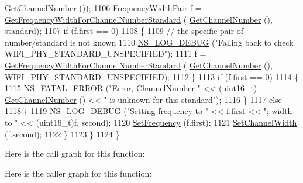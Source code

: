 \begin{DoxyCode}
      \hyperlink{classns3_1_1WifiPhy_a5cf0ccf06109ace61db51c83e91b7e8d}{GetChannelNumber} ());
1106       \hyperlink{classns3_1_1WifiPhy_abb7b47ebed22c2703bcc239729d1e40c}{FrequencyWidthPair} \hyperlink{buildings__pathloss_8m_aa52d3a6e3de5a80a97c12364caeaa125}{f} = 
      \hyperlink{classns3_1_1WifiPhy_ad4ffecf66d648b47d62ad73143a3fcbc}{GetFrequencyWidthForChannelNumberStandard} (
      \hyperlink{classns3_1_1WifiPhy_a5cf0ccf06109ace61db51c83e91b7e8d}{GetChannelNumber} (), standard);
1107       \textcolor{keywordflow}{if} (f.first == 0)
1108         \{
1109           \textcolor{comment}{// the specific pair of number/standard is not known}
1110           \hyperlink{group__logging_ga413f1886406d49f59a6a0a89b77b4d0a}{NS\_LOG\_DEBUG} (\textcolor{stringliteral}{"Falling back to check WIFI\_PHY\_STANDARD\_UNSPECIFIED"});
1111           f = \hyperlink{classns3_1_1WifiPhy_ad4ffecf66d648b47d62ad73143a3fcbc}{GetFrequencyWidthForChannelNumberStandard} (
      \hyperlink{classns3_1_1WifiPhy_a5cf0ccf06109ace61db51c83e91b7e8d}{GetChannelNumber} (), \hyperlink{group__wifi_gga1299834f4e1c615af3ca738033b76a49a95f590f4512ff9645bba0b4f2650f92d}{WIFI\_PHY\_STANDARD\_UNSPECIFIED});
1112         \}
1113       \textcolor{keywordflow}{if} (f.first == 0)
1114         \{
1115           \hyperlink{group__fatal_ga5131d5e3f75d7d4cbfd706ac456fdc85}{NS\_FATAL\_ERROR} (\textcolor{stringliteral}{"Error, ChannelNumber "} << (uint16\_t)
      \hyperlink{classns3_1_1WifiPhy_a5cf0ccf06109ace61db51c83e91b7e8d}{GetChannelNumber} () << \textcolor{stringliteral}{" is unknown for this standard"});
1116         \}
1117       \textcolor{keywordflow}{else}
1118         \{
1119           \hyperlink{group__logging_ga413f1886406d49f59a6a0a89b77b4d0a}{NS\_LOG\_DEBUG} (\textcolor{stringliteral}{"Setting frequency to "} << f.first << \textcolor{stringliteral}{"; width to "} << (uint16\_t)f.
      second);
1120           \hyperlink{classns3_1_1WifiPhy_afecd69b20631e112aa863dbed4c4bd22}{SetFrequency} (f.first);
1121           \hyperlink{classns3_1_1WifiPhy_ad4be164ac9858e525cf6c6194c39e015}{SetChannelWidth} (f.second);
1122         \}
1123     \}
1124 \}
\end{DoxyCode}


Here is the call graph for this function\+:




Here is the caller graph for this function\+:



